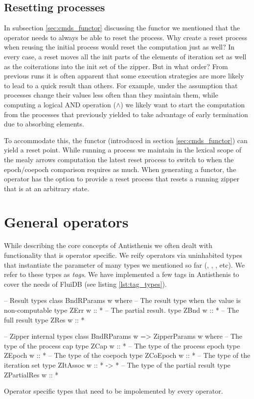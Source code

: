 \subsection{Resetting processes}
\label{sec:process_resetting}

In subsection \ref{sec:cmds_functor} discussing the  functor we
mentioned that the operator needs to always be able to reset the process. Why create a reset
process when reusing the initial process would reset the computation
just as well? In every case, a reset moves all the init parts of the
elements of iteration set as well as the coiterations into the init
set of the zipper. But in what order? From previous runs it is often
apparent that some execution strategies are more likely to lead to a
quick result than others. For example, under the assumption that
processes change their values less often than they maintain them,
while computing a logical AND operation (\(\land\)) we likely want to
start the computation from the processes that previously yielded
 to take advantage of early termination due to absorbing elements.

To accommodate this, the  functor (introduced in section
\ref{sec:cmds_functor}) can yield a reset point. While running a
process we maintain in the lexical scope of the mealy arrows
computation the latest reset process to switch to when the
epoch/coepoch comparison requires as much. When generating a
 functor, the operator has the option to provide a reset
process that resets a running zipper that is at an arbitrary state.

\section{General operators}
\label{sec:antisthenis_ops}

While describing the core concepts of Antisthenis we often dealt with
functionality that is operator specific. We reify operators via
uninhabited types that instantiate the  parameter of many
types we mentioned so far (, ,
, etc). We refer to these types as \emph{tags}. We have
implemented a few tags in Antisthenis to cover the needs of FluiDB
(see listing \ref{lst:tag_types}).


\begin{code}
\begin{haskellcode}
-- Result types
class BndRParams w where
  -- The result type when the value is non-computable
  type ZErr w :: *
  -- The partial result.
  type ZBnd w :: *
  -- The full result
  type ZRes w :: *

-- Zipper internal types
class BndRParams w => ZipperParams w where
  -- The type of the process cap
  type ZCap w :: *
  -- The type of the process epoch
  type ZEpoch w :: *
  -- The type of the coepoch
  type ZCoEpoch w :: *
  -- The type of the iteration set
  type ZItAssoc w :: * -> *
  -- The type of the partial result
  type ZPartialRes w :: *
\end{haskellcode}
  \caption{\label{lst:zipper_params}Operator specific types that need
    to be impolemented by every operator.}
\end{code}

